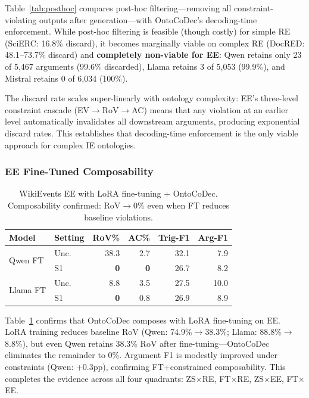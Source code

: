 \documentclass[11pt]{article}
\newcommand{\sys}{OntoCoDec}
\begin{document}
Table~\ref{tab:posthoc} compares post-hoc filtering---removing all constraint-violating outputs after generation---with \sys{}'s decoding-time enforcement.
While post-hoc filtering is feasible (though costly) for simple RE (SciERC: 16.8\% discard), it becomes marginally viable on complex RE (DocRED: 48.1--73.7\% discard) and \textbf{completely non-viable for EE}: Qwen retains only 23 of 5,467 arguments (99.6\% discarded), Llama retains 3 of 5,053 (99.9\%), and Mistral retains 0 of 6,034 (100\%).

The discard rate scales super-linearly with ontology complexity: EE's three-level constraint cascade (EV$\to$RoV$\to$AC) means that any violation at an earlier level automatically invalidates all downstream arguments, producing exponential discard rates.
This establishes that decoding-time enforcement is the only viable approach for complex IE ontologies.

\subsubsection{EE Fine-Tuned Composability}

\begin{table}[t]
\centering
\caption{WikiEvents EE with LoRA fine-tuning + \sys{}. Composability confirmed: RoV$\to$0\% even when FT reduces baseline violations.}
\label{tab:ee_ft}
\small
\begin{tabular}{ll rr rr}
\toprule
\textbf{Model} & \textbf{Setting} & \textbf{RoV\%} & \textbf{AC\%} & \textbf{Trig-F1} & \textbf{Arg-F1} \\
\midrule
\multirow{2}{*}{Qwen FT}
 & Unc. & 38.3 & 2.7 & 32.1 & 7.9 \\
 & S1 & \textbf{0} & \textbf{0} & 26.7 & 8.2 \\
\midrule
\multirow{2}{*}{Llama FT}
 & Unc. & 8.8 & 3.5 & 27.5 & 10.0 \\
 & S1 & \textbf{0} & 0.8 & 26.9 & 8.9 \\
\bottomrule
\end{tabular}
\end{table}

Table~\ref{tab:ee_ft} confirms that \sys{} composes with LoRA fine-tuning on EE.
LoRA training reduces baseline RoV (Qwen: 74.9\%$\to$38.3\%; Llama: 88.8\%$\to$8.8\%), but even Qwen retains 38.3\% RoV after fine-tuning---\sys{} eliminates the remainder to 0\%.
Argument F1 is modestly improved under constraints (Qwen: +0.3pp), confirming FT+constrained composability.
This completes the evidence across all four quadrants: ZS$\times$RE, FT$\times$RE, ZS$\times$EE, FT$\times$EE.
\end{document}
